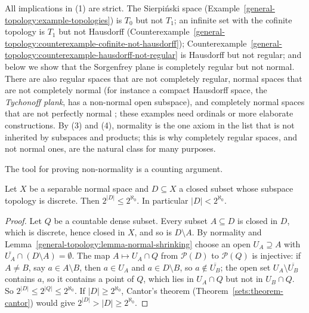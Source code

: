 All implications in (1) are strict. The Sierpi\'nski space (Example~\ref{general-topology:example-topologies}) is $T_0$ but not $T_1$; an infinite set with the cofinite topology is $T_1$ but not
Hausdorff (Counterexample~\ref{general-topology:counterexample-cofinite-not-hausdorff}); Counterexample~\ref{general-topology:counterexample-hausdorff-not-regular} is Hausdorff but not regular; and below
we show that the Sorgenfrey plane is completely regular but not normal. There are also regular spaces that are not completely regular, normal spaces that are not completely normal (for instance a compact
Hausdorff space, the \emph{Tychonoff plank}, has a non-normal open subspace), and completely normal spaces that are not perfectly normal \cite{engelking-general-topology}; these examples need ordinals or
more elaborate constructions. By (3) and (4), normality is the one axiom in the list that is not inherited by subspaces and products; this is why completely regular spaces, and not normal ones, are the natural
class for many purposes.

The tool for proving non-normality is a counting argument.

\begin{lemma}\label{general-topology:lemma-jones}
Let $X$ be a separable normal space and $D \subseteq X$ a closed subset whose subspace topology is discrete. Then $2^{|D|} \leq 2^{\aleph_0}$. In particular $|D| < 2^{\aleph_0}$.
\end{lemma}

\begin{proof}
Let $Q$ be a countable dense subset. Every subset $A \subseteq D$ is closed in $D$, which is discrete, hence closed in $X$, and so is $D \setminus A$. By normality and
Lemma~\ref{general-topology:lemma-normal-shrinking} choose an open $U_A \supseteq A$ with $\overline{U_A} \cap (D \setminus A) = \emptyset$. The map $A \mapsto U_A \cap Q$ from $\mathcal{P}(D)$ to $\mathcal{P}(Q)$ is
injective: if $A \neq B$, say $a \in A \setminus B$, then $a \in U_A$ and $a \in D \setminus B$, so $a \notin \overline{U_B}$; the open set $U_A \setminus \overline{U_B}$ contains $a$, so it contains a point of $Q$, which lies in
$U_A \cap Q$ but not in $U_B \cap Q$. So $2^{|D|} \leq 2^{|Q|} \leq 2^{\aleph_0}$. If $|D| \geq 2^{\aleph_0}$, Cantor's theorem (Theorem~\ref{sets:theorem-cantor}) would give $2^{|D|} > |D| \geq 2^{\aleph_0}$.
\end{proof}

